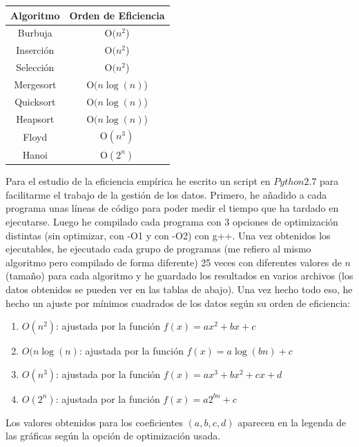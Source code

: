 \documentclass[12pt]{article}
\begin{document}
\begin{center}
\begin{tabular}{| c | c |}
\hline
Algoritmo & Orden de Eficiencia \\ \hline
Burbuja & O$(n^2$) \\ \hline
Inserción & O$(n^2$) \\ \hline 
Selección & O$(n^2$) \\ \hline 
Mergesort & O$(n\log(n)$) \\ \hline 
Quicksort & O$(n\log(n)$) \\ \hline 
Heapsort & O$(n\log(n)$) \\ \hline
Floyd & O$(n^3)$ \\ \hline 
Hanoi & O$(2^n)$ \\ \hline 
\hline
\end{tabular}
\end{center}

Para el estudio de la eficiencia empírica he escrito un script  en $Python 2.7$ para facilitarme el trabajo de la gestión de los datos. Primero, he añadido a cada programa unas líneas de código para poder medir el tiempo que ha tardado en ejecutarse. Luego he compilado cada programa con 3 opciones de optimización distintas (sin optimizar, con -O1 y con -O2) con g++. Una vez obtenidos los ejecutables, he ejecutado cada grupo de programas (me refiero al mismo algoritmo pero compilado de forma diferente) 25 veces con diferentes valores de $n$ (tamaño) para cada algoritmo y he guardado los resultados en varios archivos (los datos obtenidos se pueden ver en las tablas de abajo). Una vez hecho todo eso, he hecho un ajuste por mínimos cuadrados de los datos según su orden de eficiencia:

\begin{enumerate}
\item $O(n^2)$: ajustada por la función $f(x)=ax^2+bx+c$
\item $O(n\log(n)$: ajustada por la función $f(x)=a\log(bn)+c$
\item $O(n^3)$: ajustada por la función $f(x)=ax^3+bx^2+cx+d$
\item $O(2^n)$: ajustada por la función $f(x)=a2^{bn}+c$
\end{enumerate}

Los valores obtenidos para los coeficientes $(a,b,c,d)$ aparecen en la legenda de las gráficas según la opción de optimización usada.
\end{document}
